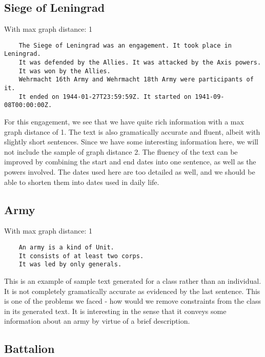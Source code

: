 \documentclass[12pt, letterpaper]{article}
\begin{document}
  \subsection*{Siege of Leningrad}

  With max graph distance: 1
  \begin{lstlisting}
	The Siege of Leningrad was an engagement. It took place in Leningrad. 
	It was defended by the Allies. It was attacked by the Axis powers. 
	It was won by the Allies. 
	Wehrmacht 16th Army and Wehrmacht 18th Army were participants of it. 
	It ended on 1944-01-27T23:59:59Z. It started on 1941-09-08T00:00:00Z.
  \end{lstlisting}

  \vspace{4mm}

  \noindent
  For this engagement, we see that we have quite rich information with a max graph distance of 1.
  The text is also gramatically accurate and fluent, albeit with slightly short sentences.
  Since we have some interesting information here, we will not include the sample of graph distance 2.
  The fluency of the text can be improved by combining the start and end dates into one sentence, as well as the
  powers involved.
  The dates used here are too detailed as well, and we should be able to shorten them into dates used in daily life.


  \subsection*{Army}

  With max graph distance: 1
  \begin{lstlisting}
	An army is a kind of Unit. 
	It consists of at least two corps. 
	It was led by only generals.
  \end{lstlisting}

  \vspace{4mm}

  \noindent
  This is an example of sample text generated for a class rather than an individual.
  It is not completely gramatically accurate as evidenced by the last sentence.
  This is one of the problems we faced - how would we remove constraints from the class in its generated text.
  It is interesting in the sense that it conveys some information about an army by virtue of a brief description.


  \subsection*{Battalion}
  
\end{document}
